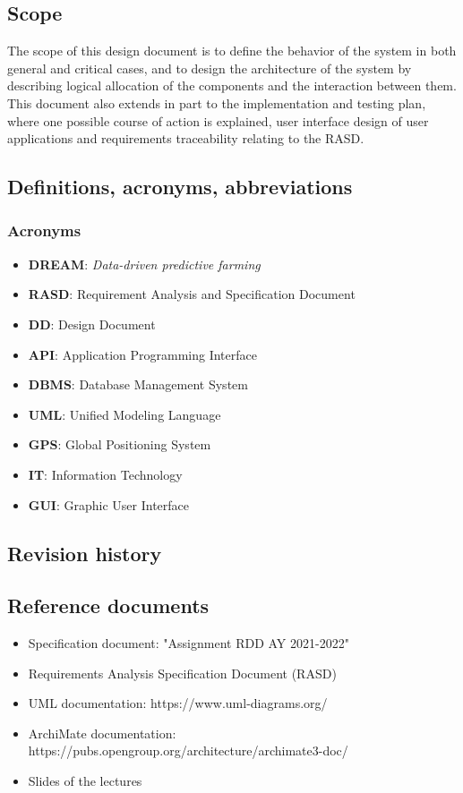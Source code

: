 \documentclass[table, 12pt]{article}
\begin{document}
\subsection{Scope}
The scope of this design document is to define the behavior of the system in both general and critical cases, and to design the architecture of the system by describing
logical allocation of the components and the interaction between them.
This document also extends in part to the implementation and testing plan, where one possible course of action is explained, user interface design of user applications and requirements traceability relating to the RASD.
\subsection{Definitions, acronyms, abbreviations}
\subsubsection*{Acronyms}
\begin{itemize}
    \item \textbf{DREAM}: \emph{Data-driven predictive farming}
    \item \textbf{RASD}: Requirement Analysis and Specification Document
    \item \textbf{DD}: Design Document
    \item \textbf{API}: Application Programming Interface
    \item \textbf{DBMS}: Database Management System
    \item \textbf{UML}: Unified Modeling Language
    \item \textbf{GPS}: Global Positioning System
    \item \textbf{IT}: Information Technology
    \item \textbf{GUI}: Graphic User Interface
\end{itemize}
\subsection{Revision history}

\subsection{Reference documents}
\begin{itemize}
    \item Specification document: "Assignment RDD AY 2021-2022"
    \item Requirements Analysis Specification Document (RASD)
    \item UML documentation: https://www.uml-diagrams.org/
    \item ArchiMate documentation: https://pubs.opengroup.org/architecture/archimate3-doc/
    \item Slides of the lectures
\end{itemize}
\end{document}
